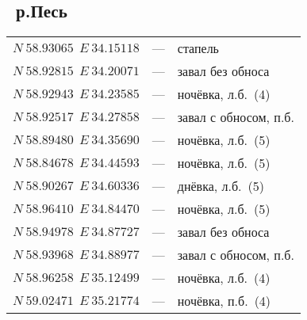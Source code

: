 \newpage 
\subsection*{~р.Песь}
\begin{longtable}[c]{>{\raggedright}m{40mm} >{\raggedleft}m{7mm}>{\raggedright}p{65mm} }
${N~58.93065~~E~34.15118}$ & --- & стапель\tabularnewline	
${N~58.92815~~E~34.20071}$ & --- & завал без обноса\tabularnewline	
${N~58.92943~~E~34.23585}$ & --- & ночёвка, л.б.~(4)\tabularnewline	
${N~58.92517~~E~34.27858}$ & --- & завал с обносом, п.б.\tabularnewline	
${N~58.89480~~E~34.35690}$ & --- & ночёвка, л.б.~(5)\tabularnewline	
${N~58.84678~~E~34.44593}$ & --- & ночёвка, л.б.~(5)\tabularnewline	
${N~58.90267~~E~34.60336}$ & --- & днёвка, л.б.~(5)\tabularnewline	
${N~58.96410~~E~34.84470}$ & --- & ночёвка, л.б.~(5)\tabularnewline	
${N~58.94978~~E~34.87727}$ & --- & завал без обноса\tabularnewline	
${N~58.93968~~E~34.88977}$ & --- & завал с обносом, п.б.\tabularnewline	
${N~58.96258~~E~35.12499}$ & --- & ночёвка, л.б.~(4)\tabularnewline	
${N~59.02471~~E~35.21774}$ & --- & ночёвка, п.б.~(4)\tabularnewline	
\end{longtable}	